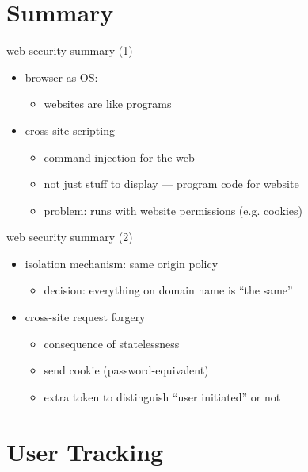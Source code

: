 \section{Summary}

\begin{frame}{web security summary (1)}
    \begin{itemize}
    \item browser as OS:
        \begin{itemize}
        \item websites are like programs
        \end{itemize}
    \item cross-site scripting
        \begin{itemize}
        \item command injection for the web
        \item not just stuff to display --- program code for website
        \item problem: runs with website permissions (e.g. cookies)
        \end{itemize}
    \end{itemize}
\end{frame}

\begin{frame}{web security summary (2)}
    \begin{itemize}
    \item isolation mechanism: same origin policy
        \begin{itemize}
        \item decision: everything on domain name is ``the same''
        \end{itemize}
    \item cross-site request forgery
        \begin{itemize}
        \item consequence of statelessness
        \item {} send cookie (password-equivalent)
        \item extra token to distinguish ``user initiated'' or not
        \end{itemize}
    \end{itemize}
\end{frame}

\section{User Tracking}

